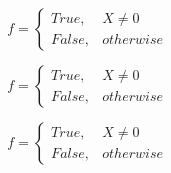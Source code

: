 \documentclass[a4paper]{article}
\begin{document}
\begin{equation}   f =
\begin{cases} True, & X \neq 0\\
False, & otherwise
\end{cases}
\end{equation}

\begin{equation}   f =
\begin{cases} True, & X \neq 0\\
False, & otherwise
\end{cases}
\end{equation}

\begin{equation}   f =
\begin{cases} True, & X \neq 0\\
False, & otherwise
\end{cases}
\end{equation}
\end{document}
